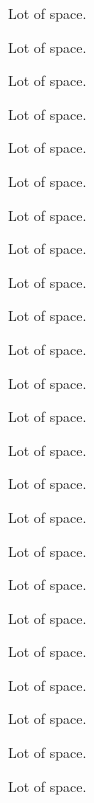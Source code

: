 \documentclass{article}
\begin{document}
Lot of space.\par
Lot of space.\par
Lot of space.\par
Lot of space.\par
Lot of space.\par
Lot of space.\par
Lot of space.\par
Lot of space.\par
Lot of space.\par
Lot of space.\par
Lot of space.\par
Lot of space.\par
Lot of space.\par
Lot of space.\par
Lot of space.\par
Lot of space.\par
Lot of space.\par
Lot of space.\par
Lot of space.\par
Lot of space.\par
Lot of space.\par
Lot of space.\par
Lot of space.\par
Lot of space.\par
\end{document}
